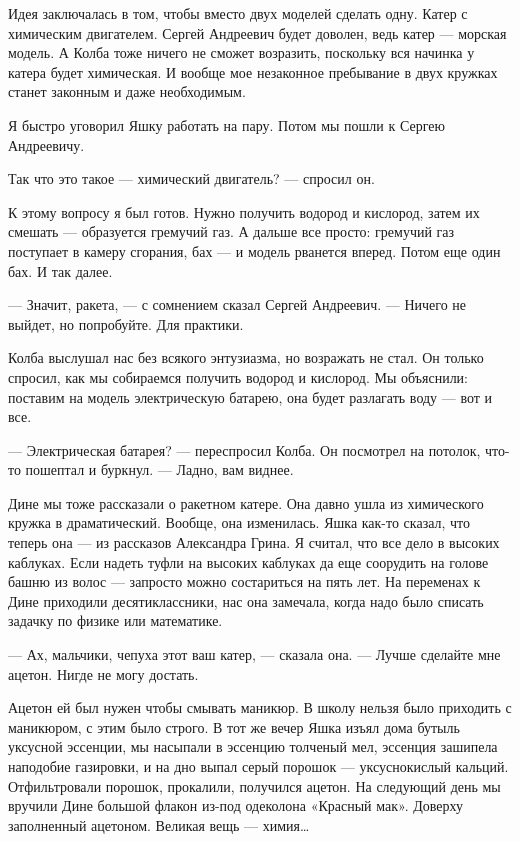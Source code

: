 Идея заключалась в том,  чтобы вместо двух моделей  сделать одну. Катер  с
химическим двигателем.  Сергей  Андреевич  будет  доволен,  ведь  катер  —
морская модель. А  Колба тоже  ничего не сможет  возразить, поскольку  вся
начинка у катера будет  химическая. И вообще  мое незаконное пребывание  в
двух кружках станет законным и даже необходимым.

Я быстро  уговорил  Яшку  работать  на  пару.  Потом  мы  пошли  к  Сергею
Андреевичу.

Так что это такое — химический двигатель? — спросил он.

К этому вопросу я был готов.  Нужно получить водород и кислород, затем  их
смешать —  образуется гремучий  газ.  А дальше  все просто:  гремучий  газ
поступает в камеру  сгорания, бах —  и модель рванется  вперед. Потом  еще
один бах. И так далее.

— Значит,  ракета, —  с сомнением  сказал Сергей  Андреевич. —  Ничего  не
выйдет, но попробуйте. Для практики.

Колба выслушал нас без всякого энтузиазма, но возражать не стал. Он только
спросил, как  мы собираемся  получить водород  и кислород.  Мы  объяснили:
поставим на модель электрическую батарею, она будет разлагать воду — вот и
все.

— Электрическая батарея?  — переспросил  Колба. Он  посмотрел на  потолок,
что-то пошептал и буркнул. — Ладно, вам виднее.

Дине мы тоже рассказали о ракетном  катере. Она давно ушла из  химического
кружка в драматический.  Вообще, она изменилась.  Яшка как-то сказал,  что
теперь она  — из  рассказов Александра  Грина. Я  считал, что  все дело  в
высоких каблуках. Если надеть туфли  на высоких каблуках да еще  соорудить
на голове  башню из  волос —  запросто можно  состариться на  пять лет.  На
переменах к Дине приходили десятиклассники,  нас она замечала, когда  надо
было списать задачку по физике или математике.

— Ах, мальчики, чепуха этот ваш катер, — сказала она. — Лучше сделайте мне
ацетон. Нигде не могу достать.

Ацетон ей был нужен чтобы смывать маникюр. В школу нельзя было приходить с
маникюром, с  этим было  строго. В  тот же  вечер Яшка  изъял дома  бутыль
уксусной эссенции, мы насыпали в эссенцию толченый мел, эссенция  зашипела
наподобие газировки, и на дно выпал серый порошок — уксуснокислый кальций.
Отфильтровали порошок, прокалили, получился  ацетон. На следующий день  мы
вручили Дине  большой  флакон  из-под  одеколона  «Красный  мак».  Доверху
заполненный ацетоном. Великая вещь — химия…

